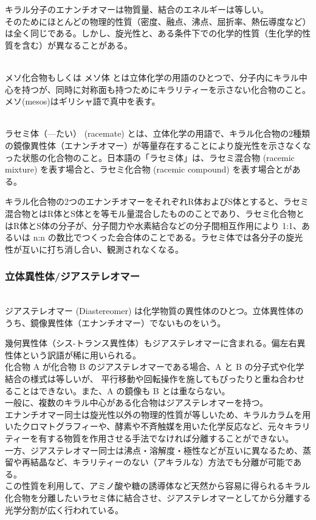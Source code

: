 \documentclass[dvipdfmx,uplatex]{jsarticle}
\begin{document}
キラル分子のエナンチオマーは物質量、結合のエネルギーは等しい。 \\
そのためにほとんどの物理的性質（密度、融点、沸点、屈折率、熱伝導度など）は全く同じである。しかし、旋光性と、ある条件下での化学的性質（生化学的性質を含む）が異なることがある。 \\

\begin{defi} \mbox{} \\
メソ化合物もしくは メソ体 とは立体化学の用語のひとつで、分子内にキラル中心を持つが、同時に対称面も持つためにキラリティーを示さない化合物のこと。メソ(mesos)はギリシャ語で真中を表す。
\end{defi}

\begin{defi} \mbox{} \\
ラセミ体（—たい） (racemate) とは、立体化学の用語で、キラル化合物の2種類の鏡像異性体（エナンチオマー）が等量存在することにより旋光性を示さなくなった状態の化合物のこと。日本語の「ラセミ体」は、ラセミ混合物 (racemic mixture) を表す場合と、ラセミ化合物 (racemic compound) を表す場合とがある。
\end{defi}

キラル化合物の2つのエナンチオマーをそれぞれR体およびS体とすると、ラセミ混合物とはR体とS体とを等モル量混合したもののことであり、ラセミ化合物とはR体とS体の分子が、分子間力や水素結合などの分子間相互作用により 1:1、あるいは n:n の数比でつくった会合体のことである。ラセミ体では各分子の旋光性が互いに打ち消し合い、観測されなくなる。

\subsubsection{立体異性体/ジアステレオマー}
\begin{defi} \mbox{} \\
ジアステレオマー (Diastereomer) は化学物質の異性体のひとつ。立体異性体のうち、鏡像異性体（エナンチオマー）でないものをいう。 \\
\end{defi}
幾何異性体（シス-トランス異性体）もジアステレオマーに含まれる。偏左右異性体という訳語が稀に用いられる。 \\
化合物 A が化合物 B のジアステレオマーである場合、A と B の分子式や化学結合の様式は等しいが、
平行移動や回転操作を施してもぴったりと重ね合わせることはできない。また、A の鏡像も B とは重ならない。 \\
一般に、複数のキラル中心がある化合物はジアステレオマーを持つ。 \\
エナンチオマー同士は旋光性以外の物理的性質が等しいため、キラルカラムを用いたクロマトグラフィーや、酵素や不斉触媒を用いた化学反応など、元々キラリティーを有する物質を作用させる手法でなければ分離することができない。 \\
一方、ジアステレオマー同士は沸点・溶解度・極性などが互いに異なるため、蒸留や再結晶など、キラリティーのない（アキラルな）方法でも分離が可能である。 \\
この性質を利用して、アミノ酸や糖の誘導体など天然から容易に得られるキラル化合物を分離したいラセミ体に結合させ、ジアステレオマーとしてから分離する光学分割が広く行われている。 \\
\end{document}
